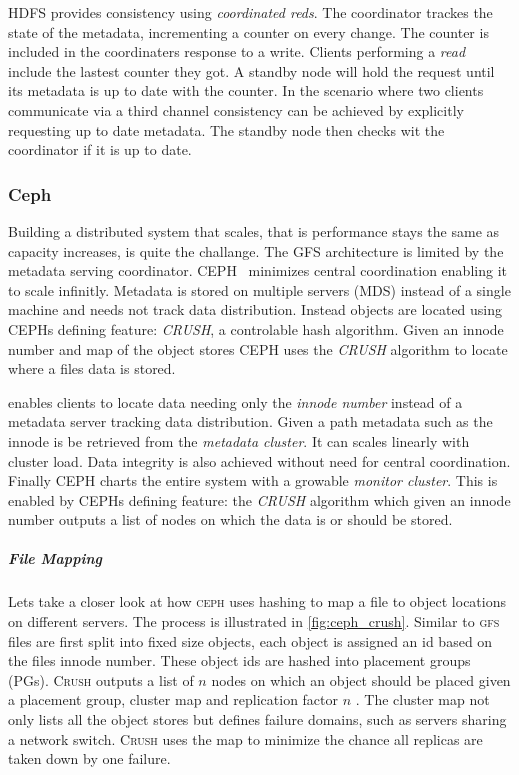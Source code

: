 \textsc{HDFS} provides consistency using \textit{coordinated reds}. The coordinator trackes the state of the metadata, incrementing a counter on every change. The counter is included in the coordinaters response to a write. Clients performing a \textit{read} include the lastest counter they got. A standby node will hold the request until its metadata is up to date with the counter. In the scenario where two clients communicate via a third channel consistency can be achieved by explicitly requesting up to date metadata. The standby node then checks wit the coordinator if it is up to date.

\subsubsection*{Ceph}
Building a distributed system that scales, that is performance stays the same as capacity increases, is quite the challange. The \textsc{GFS} architecture is limited by the metadata serving coordinator. \textsc{CEPH}~\cite{ceph} minimizes central coordination enabling it to scale infinitly. Metadata is stored on multiple servers (MDS) instead of a single machine and needs not track data distribution. Instead objects are located using \textsc{CEPH}s defining feature: \emph{CRUSH}, a controlable hash algorithm. Given an innode number and map of the object stores \textsc{CEPH} uses the \emph{CRUSH} algorithm to locate where a files data is stored. 

enables clients to locate data needing only the \textit{innode number} instead of a metadata server tracking data distribution. Given a path metadata such as the innode is be retrieved from the \textit{metadata cluster}. It can scales linearly with cluster load. Data integrity is also achieved without need for central coordination. Finally \textsc{CEPH} charts the entire system with a growable \textit{monitor cluster}. This is enabled by \textsc{CEPH}s defining feature: the \emph{CRUSH} algorithm which given an innode number outputs a list of nodes on which the data is or should be stored.

\subparagraph{File Mapping}
Lets take a closer look at how \textsc{ceph} uses hashing to map a file to object locations on different servers. The process is illustrated in \cref{fig:ceph_crush}. Similar to \textsc{gfs} files are first split into fixed size objects, each object is assigned an id based on the files innode number. These object ids are hashed into placement groups (PGs). \textsc{Crush} outputs a list of $n$ nodes on which an object should be placed given a placement group, cluster map and replication factor $n$ . The cluster map not only lists all the object stores but defines failure domains, such as servers sharing a network switch. \textsc{Crush} uses the map to minimize the chance all replicas are taken down by one failure.

